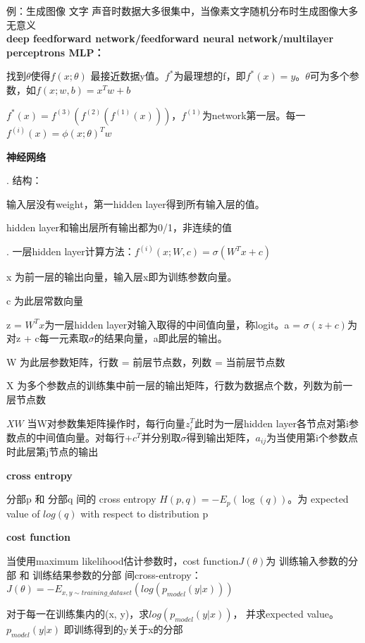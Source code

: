 \documentclass[UTF8]{ctexart}
\begin{document}
  例：生成图像 文字 声音时数据大多很集中，当像素文字随机分布时生成图像大多无意义\\
\textbf{deep feedforward network/feedforward neural network/multilayer perceptrons MLP：}

  找到$\theta$使得$f(x; \theta )$ 最接近数据y值。$f^*$为最理想的f，即$f^*(x) = y$。$\theta $可为多个参数，如$f(x; w, b) = x^Tw+b$

  $f^*(x) = f^{(3)}(f^{(2)}(f^{(1)}(x)))$，$f^{(1)}$为network第一层。每一$f^{(i)}(x) = \phi (x; \theta )^Tw$

  \textbf{神经网络}

  . 结构：

  \quad \quad 输入层没有weight，第一hidden layer得到所有输入层的值。

  \quad \quad hidden layer和输出层所有输出都为0/1，非连续的值

  . 一层hidden layer计算方法：$ f^{(i)}(x; W, c) = \sigma (W^Tx + c)$

  \quad \quad x 为前一层的输出向量，输入层x即为训练参数向量。 

  \quad \quad c 为此层常数向量

  \quad \quad z = $W^Tx$为一层hidden layer对输入取得的中间值向量，称logit。a = $\sigma (z + c)$为对z + c每一元素取$\sigma $的结果向量，a即此层的输出。

  \quad \quad W 为此层参数矩阵，行数 = 前层节点数，列数 = 当前层节点数

  \quad \quad X 为多个参数点的训练集中前一层的输出矩阵，行数为数据点个数，列数为前一层节点数

  \quad \quad $XW$ 当W对参数集矩阵操作时，每行向量$z_{i}^T$此时为一层hidden layer各节点对第i参数点的中间值向量。对每行+$c^T$并分别取$\sigma $得到输出矩阵，$a_{ij}$为当使用第i个参数点时此层第j节点的输出

  \textbf{cross entropy}

  \quad 分部p 和 分部q 间的 cross entropy $H(p, q) = -E_p(\log (q))$。为 expected value of $log (q)$ with respect to distribution p

  \textbf{cost function}

  \quad 当使用maximum likelihood估计参数时，cost function$J(\theta )$为 训练输入参数的分部 和 训练结果参数的分部 间cross-entropy： $J(\theta ) = -E_{x, y\sim training\_dataset}(log (p_{model}(y | x)))$

  \quad \quad 对于每一在训练集内的(x, y)，求$log (p_{model}(y | x))$， 并求expected value。$p_{model}(y | x)$ 即训练得到的y关于x的分部
\end{document}
